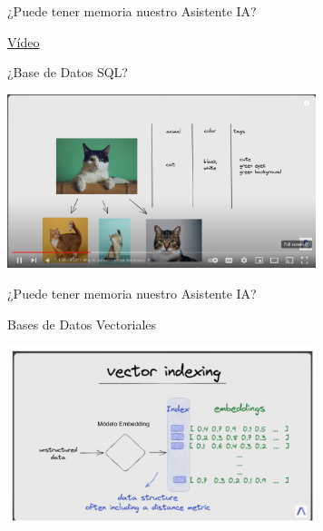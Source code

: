 \documentclass[table, unknownkeysallowed, 10pt]{beamer}
\begin{document}
\begin{frame}{¿Puede tener memoria nuestro Asistente IA?}
    \begin{center}
    \href{https://www.youtube.com/watch?v=dN0lsF2cvm4}{Vídeo}
    \end{center}
    \begin{block}{¿Base de Datos SQL?}
    \begin{center}
        \includegraphics[width=9cm]{imagenes/vectorsql.png}
    \end{center}
\end{block}
\end{frame}

\begin{frame}{¿Puede tener memoria nuestro Asistente IA?}
    \begin{block}{Bases de Datos Vectoriales}
    \begin{center}
        \includegraphics[width=9cm]{imagenes/vectorDB.png}
    \end{center}
\end{block}
\end{frame}
\end{document}
